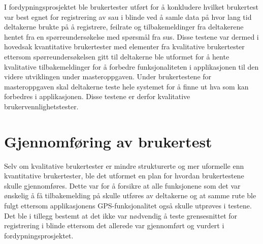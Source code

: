 \newline
\newline
I fordypningsprosjektet ble brukertester utført for å konkludere hvilket brukertest var best egnet for registrering av sau i blinde ved å samle data på hvor lang tid deltakerne brukte på å registrere, feilrate og tilbakemeldinger fra deltakerene hentet fra en spørreundersøkelse med spørsmål fra \acrfull{sus}. Disse testene var dermed i hovedsak kvantitative brukertester med elementer fra kvalitative brukertester ettersom spørreundersøkelsen gitt til deltakerne ble utformet for å hente kvalitative tilbakemeldinger for å forbedre funksjonaliteten i applikasjonen til den videre utviklingen under masteroppgaven. Under brukertestene for masteroppgaven skal deltakerne teste hele systemet for å finne ut hva som kan forbedres i applikasjonen. Disse testene er derfor kvalitative brukervennlighetstester. 

\section{Gjennomføring av brukertest}
Selv om kvalitative brukertester er mindre strukturerte og mer uformelle enn kvantitative brukertester, ble det utformet en plan for hvordan brukertestene skulle gjennomføres. Dette var for å forsikre at alle funksjonene som det var ønskelig å få tilbakemelding på skulle utføres av deltakerne og at samme rute ble fulgt ettersom applikasjonens GPS-funksjonalitet også skulle utprøves i testene. Det ble i tillegg bestemt at det ikke var nødvendig å teste grensesnittet for registrering i blinde ettersom det allerede var gjennomført og vurdert i fordypningsprosjektet.

